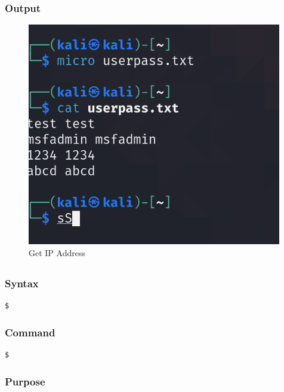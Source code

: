\documentclass[11pt]{article}
\begin{document}
\subsubsection*{Output}
\begin{figure}[H]
    \centering
    \includegraphics[width=0.99\textwidth]{a3_ss (27).png}
    \caption{Get IP Address}
    \label{fig:1}
\end{figure}
\subsection{}

\subsubsection*{Syntax}
\begin{verbatim}
$
\end{verbatim}

\subsubsection*{Command}
\begin{verbatim}
$
\end{verbatim}

\subsubsection*{Purpose}
\end{document}
